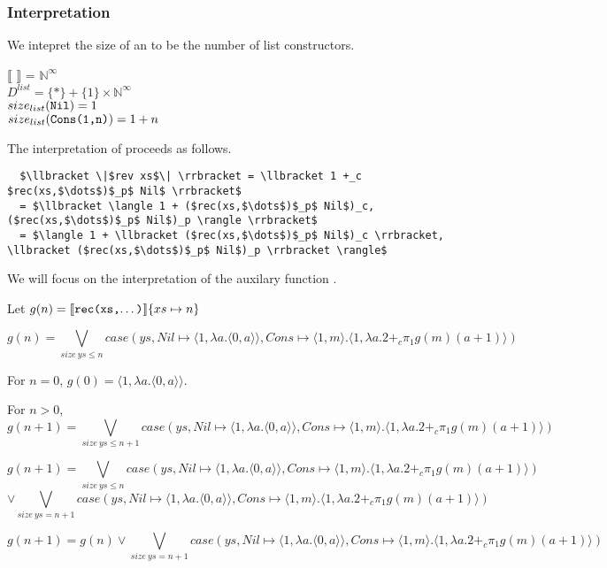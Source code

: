 \subsubsection*{Interpretation}

We intepret the size of an  to be the number of list constructors.
\begin{framed}
$\llbracket$  $\rrbracket$ = $\mathbb{N}^\infty$\\
$D^{list} = \{\ast\} + \{1\} \times \mathbb{N}^\infty$\\
$size_{list}(\texttt{Nil}) = 1$\\
$size_{list}(\texttt{Cons(1,n)}) = 1 + n$\\
\end{framed}

The interpretation of  proceeds as follows.
\begin{lstlisting}
  $\llbracket \|$rev xs$\| \rrbracket = \llbracket 1 +_c $rec(xs,$\dots$)$_p$ Nil$ \rrbracket$
  = $\llbracket \langle 1 + ($rec(xs,$\dots$)$_p$ Nil$)_c, ($rec(xs,$\dots$)$_p$ Nil$)_p \rangle \rrbracket$
  = $\langle 1 + \llbracket ($rec(xs,$\dots$)$_p$ Nil$)_c \rrbracket, \llbracket ($rec(xs,$\dots$)$_p$ Nil$)_p \rrbracket \rangle$
\end{lstlisting}

We will focus on the interpretation of the auxilary function .

Let $g(n) = \llbracket \texttt{rec(xs,$\dots$)} \rrbracket \{xs \mapsto n\}$

\[g(n) = \bigvee_{size\ ys \leq n} case(ys, Nil \mapsto \langle1,\lambda a.\langle 0,a\rangle\rangle, Cons \mapsto \langle 1,m \rangle.\langle 1, \lambda a. 2 +_c \pi_1g(m) (a+1)\rangle)\]

For $n=0$, $g(0) = \langle 1,\lambda a.\langle 0,a\rangle\rangle$.

For $n>0$,
\[g(n+1) = \bigvee_{size\ ys \leq n+1} case(ys, Nil \mapsto \langle1,\lambda a.\langle 0,a\rangle\rangle, Cons \mapsto \langle 1,m \rangle.\langle 1, \lambda a. 2 +_c \pi_1g(m) (a+1)\rangle)\]

\[ g(n+1) = \bigvee_{size\ ys \leq n} case(ys, Nil \mapsto \langle1,\lambda a.\langle 0,a\rangle\rangle, Cons \mapsto \langle 1,m \rangle.\langle 1, \lambda a. 2 +_c \pi_1g(m) (a+1)\rangle) \]
\[ \vee \bigvee_{size\ ys = n+1} case(ys, Nil \mapsto \langle1,\lambda a.\langle 0,a\rangle\rangle, Cons \mapsto \langle 1,m \rangle.\langle 1, \lambda a. 2 +_c \pi_1g(m) (a+1)\rangle) \]
 
\[ g(n+1) = g(n) \vee \bigvee_{size\ ys = n+1} case(ys, Nil \mapsto \langle1,\lambda a.\langle 0,a\rangle\rangle, Cons \mapsto \langle 1,m \rangle.\langle 1, \lambda a. 2 +_c \pi_1g(m) (a+1)\rangle) \]

